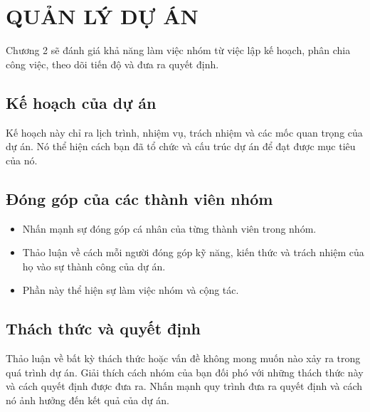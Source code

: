

\chapter{QUẢN LÝ DỰ ÁN}

Chương 2 sẽ đánh giá khả năng làm việc nhóm từ việc lập kế hoạch, phân chia công việc,
theo dõi tiến độ và đưa ra quyết định.

\section{Kế hoạch của dự án}
Kế hoạch này chỉ ra lịch trình, nhiệm vụ, trách nhiệm và các mốc quan trọng của dự án. Nó thể hiện cách bạn đã tổ chức và cấu trúc dự án để đạt được mục tiêu của nó.

\section{Đóng góp của các thành viên nhóm}
\begin{itemize}
\item Nhấn mạnh sự đóng góp cá nhân của từng thành viên trong nhóm.
\item Thảo luận về cách mỗi người đóng góp kỹ năng, kiến thức và trách nhiệm của họ vào sự thành công của dự án.
\item Phần này thể hiện sự làm việc nhóm và cộng tác.
\end{itemize}

\section{Thách thức và quyết định}
Thảo luận về bất kỳ thách thức hoặc vấn đề không mong muốn nào xảy ra trong quá trình dự án. Giải thích cách nhóm của bạn đối phó với những thách thức này và cách quyết định được đưa ra. Nhấn mạnh quy trình đưa ra quyết định và cách nó ảnh hưởng đến kết quả của dự án.